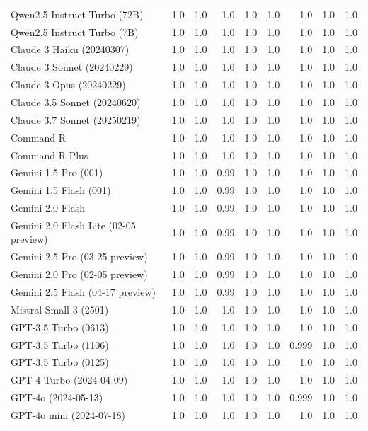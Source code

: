 \begin{table}[htp]
{\begin{tabular}{lrrrrrrrr}
Qwen2.5 Instruct Turbo (72B) & 1.0 & 1.0 & 1.0 & 1.0 & 1.0 & 1.0 & 1.0 & 1.0 \\
Qwen2.5 Instruct Turbo (7B) & 1.0 & 1.0 & 1.0 & 1.0 & 1.0 & 1.0 & 1.0 & 1.0 \\
Claude 3 Haiku (20240307) & 1.0 & 1.0 & 1.0 & 1.0 & 1.0 & 1.0 & 1.0 & 1.0 \\
Claude 3 Sonnet (20240229) & 1.0 & 1.0 & 1.0 & 1.0 & 1.0 & 1.0 & 1.0 & 1.0 \\
Claude 3 Opus (20240229) & 1.0 & 1.0 & 1.0 & 1.0 & 1.0 & 1.0 & 1.0 & 1.0 \\
Claude 3.5 Sonnet (20240620) & 1.0 & 1.0 & 1.0 & 1.0 & 1.0 & 1.0 & 1.0 & 1.0 \\
Claude 3.7 Sonnet (20250219) & 1.0 & 1.0 & 1.0 & 1.0 & 1.0 & 1.0 & 1.0 & 1.0 \\
Command R & 1.0 & 1.0 & 1.0 & 1.0 & 1.0 & 1.0 & 1.0 & 1.0 \\
Command R Plus & 1.0 & 1.0 & 1.0 & 1.0 & 1.0 & 1.0 & 1.0 & 1.0 \\
Gemini 1.5 Pro (001) & 1.0 & 1.0 & 0.99 & 1.0 & 1.0 & 1.0 & 1.0 & 1.0 \\
Gemini 1.5 Flash (001) & 1.0 & 1.0 & 0.99 & 1.0 & 1.0 & 1.0 & 1.0 & 1.0 \\
Gemini 2.0 Flash & 1.0 & 1.0 & 0.99 & 1.0 & 1.0 & 1.0 & 1.0 & 1.0 \\
Gemini 2.0 Flash Lite (02-05 preview) & 1.0 & 1.0 & 0.99 & 1.0 & 1.0 & 1.0 & 1.0 & 1.0 \\
Gemini 2.5 Pro (03-25 preview) & 1.0 & 1.0 & 0.99 & 1.0 & 1.0 & 1.0 & 1.0 & 1.0 \\
Gemini 2.0 Pro (02-05 preview) & 1.0 & 1.0 & 0.99 & 1.0 & 1.0 & 1.0 & 1.0 & 1.0 \\
Gemini 2.5 Flash (04-17 preview) & 1.0 & 1.0 & 0.99 & 1.0 & 1.0 & 1.0 & 1.0 & 1.0 \\
Mistral Small 3 (2501) & 1.0 & 1.0 & 1.0 & 1.0 & 1.0 & 1.0 & 1.0 & 1.0 \\
GPT-3.5 Turbo (0613) & 1.0 & 1.0 & 1.0 & 1.0 & 1.0 & 1.0 & 1.0 & 1.0 \\
GPT-3.5 Turbo (1106) & 1.0 & 1.0 & 1.0 & 1.0 & 1.0 & 0.999 & 1.0 & 1.0 \\
GPT-3.5 Turbo (0125) & 1.0 & 1.0 & 1.0 & 1.0 & 1.0 & 1.0 & 1.0 & 1.0 \\
GPT-4 Turbo (2024-04-09) & 1.0 & 1.0 & 1.0 & 1.0 & 1.0 & 1.0 & 1.0 & 1.0 \\
GPT-4o (2024-05-13) & 1.0 & 1.0 & 1.0 & 1.0 & 1.0 & 0.999 & 1.0 & 1.0 \\
GPT-4o mini (2024-07-18) & 1.0 & 1.0 & 1.0 & 1.0 & 1.0 & 1.0 & 1.0 & 1.0 \\

\end{tabular}}
\end{table}

